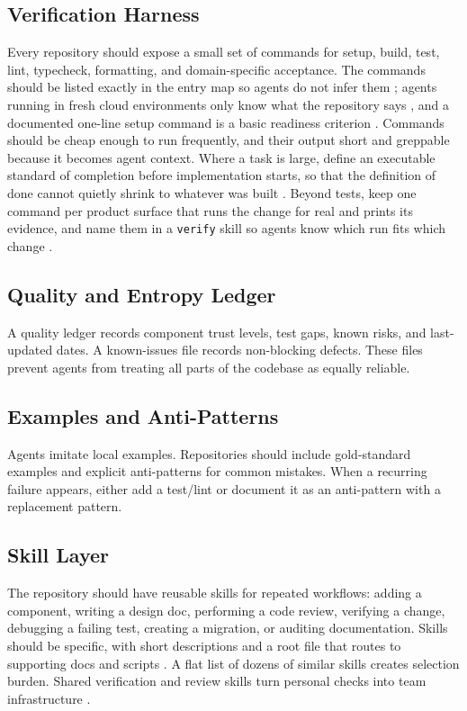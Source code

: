 \documentclass[11pt]{article}
\begin{document}
\subsection{Verification Harness}
Every repository should expose a small set of commands for setup, build, test, lint, typecheck, formatting, and domain-specific acceptance. The commands should be listed exactly in the entry map so agents do not infer them \cite{deoliveira2026verification}; agents running in fresh cloud environments only know what the repository says \cite{osmani2026cloud}, and a documented one-line setup command is a basic readiness criterion \cite{factory2026sandboxes}. Commands should be cheap enough to run frequently, and their output short and greppable because it becomes agent context. Where a task is large, define an executable standard of completion before implementation starts, so that the definition of done cannot quietly shrink to whatever was built \cite{factory2026large}. Beyond tests, keep one command per product surface that runs the change for real and prints its evidence, and name them in a \texttt{verify} skill so agents know which run fits which change \cite{osmani2026verification}.

\subsection{Quality and Entropy Ledger}
A quality ledger records component trust levels, test gaps, known risks, and last-updated dates. A known-issues file records non-blocking defects. These files prevent agents from treating all parts of the codebase as equally reliable.

\subsection{Examples and Anti-Patterns}
Agents imitate local examples. Repositories should include gold-standard examples and explicit anti-patterns for common mistakes. When a recurring failure appears, either add a test/lint or document it as an anti-pattern with a replacement pattern.

\subsection{Skill Layer}
The repository should have reusable skills for repeated workflows: adding a component, writing a design doc, performing a code review, verifying a change, debugging a failing test, creating a migration, or auditing documentation. Skills should be specific, with short descriptions and a root file that routes to supporting docs and scripts \cite{provencher2026astra}. A flat list of dozens of similar skills creates selection burden. Shared verification and review skills turn personal checks into team infrastructure \cite{deoliveira2026verification}.
\end{document}
